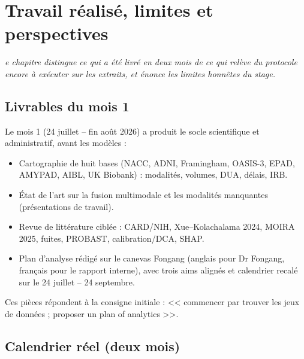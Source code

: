 \let\textcircled=\pgftextcircled
\chapter{Travail réalisé, limites et perspectives}
\label{chap:results}

\textit{e chapitre distingue ce qui a été livré en deux mois de ce qui relève du protocole encore à exécuter sur les extraits, et énonce les limites honnêtes du stage.}

\newpage 

\section{Livrables du mois 1}

Le mois 1 (24 juillet -- fin août 2026) a produit le socle scientifique et administratif, avant les modèles :

\begin{itemize}[label=, font=\large \color{darkorange}]
\item Cartographie de huit bases (NACC, ADNI, Framingham, OASIS-3, EPAD, AMYPAD, AIBL, UK Biobank) : modalités, volumes, DUA, délais, IRB.
\item État de l'art sur la fusion multimodale et les modalités manquantes (présentations de travail).
\item Revue de littérature ciblée : CARD/NIH, Xue--Kolachalama 2024, MOIRA 2025, fuites, PROBAST, calibration/\ac{DCA}, \ac{SHAP}.
\item Plan d'analyse rédigé sur le canevas Fongang (anglais pour Dr Fongang, français pour le rapport interne), avec trois aims alignés et calendrier recalé sur le 24 juillet -- 24 septembre.
\end{itemize}

Ces pièces répondent à la consigne initiale : << commencer par trouver les jeux de données ; proposer un plan of analytics >>.

\section{Calendrier réel (deux mois)}


